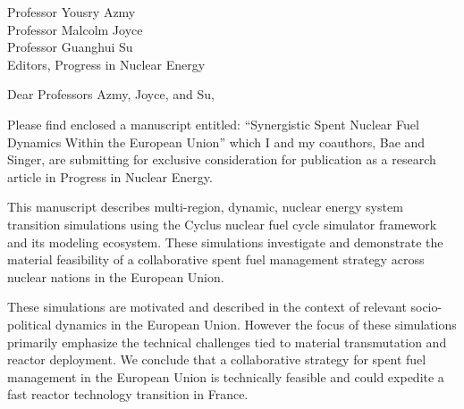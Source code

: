 \documentclass[11pt]{letter} %
\begin{document}


\begin{letter}{Professor Yousry Azmy\\
Professor Malcolm Joyce\\
Professor Guanghui Su\\
Editors, Progress in Nuclear Energy}


\address{Kathryn D. Huff\\
kdhuff@illinois.edu\\
118 Talbot Laboratory\\
MC-234\\
104 S. Wright Street\\
Urbana, IL 61801}



\opening{Dear Professors Azmy, Joyce, and Su,}

Please find enclosed a manuscript entitled: ``Synergistic Spent Nuclear Fuel 
Dynamics Within the European Union'' which I and my coauthors, Bae and Singer, 
are submitting for exclusive consideration for publication as a research 
article in Progress in Nuclear Energy.

This manuscript describes multi-region, dynamic, nuclear energy system transition 
simulations using the Cyclus nuclear fuel cycle simulator framework and its 
modeling ecosystem. These simulations investigate and demonstrate the material 
feasibility of a collaborative spent fuel management strategy across nuclear 
nations in the European Union.  

These simulations are motivated and described in the context of relevant
socio-political dynamics in the European Union. However the focus of these
simulations primarily emphasize the technical challenges tied to material transmutation
and reactor deployment. We conclude that a collaborative strategy for spent 
fuel management in the European Union is technically feasible and could 
expedite a fast reactor technology transition in France.


\end{letter}
\end{document}
